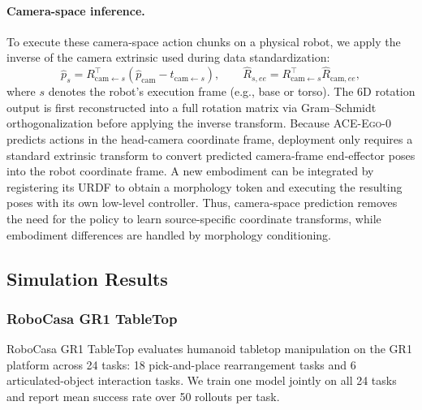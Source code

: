 \documentclass{llmxive}
\providecommand{\OURS}{\textsc{ACE-Ego-0}\xspace}
\providecommand{\Ours}{\OURS}
\begin{document}
\paragraph{Camera-space inference.}
To execute these camera-space action chunks on a physical robot, we apply the inverse of the camera extrinsic used during data standardization:
\begin{equation}
\hat{p}_s = R_{\mathrm{cam}\leftarrow s}^{\top}\!\left(\hat{p}_{\mathrm{cam}} - t_{\mathrm{cam}\leftarrow s}\right),
\qquad
\hat{R}_{s,ee} = R_{\mathrm{cam}\leftarrow s}^{\top}\hat{R}_{\mathrm{cam},ee},
\end{equation}
where $s$ denotes the robot's execution frame (e.g., base or torso). The 6D rotation output is first reconstructed into a full rotation matrix via Gram--Schmidt orthogonalization before applying the inverse transform.
Because \Ours predicts actions in the head-camera coordinate frame, deployment only requires a standard extrinsic transform to convert predicted camera-frame end-effector poses into the robot coordinate frame. A new embodiment can be integrated by registering its URDF to obtain a morphology token and executing the resulting poses with its own low-level controller. Thus, camera-space prediction removes the need for the policy to learn source-specific coordinate transforms, while embodiment differences are handled by morphology conditioning.

\subsection{Simulation Results}
\label{sec:sim_results}

\subsubsection{RoboCasa GR1 TableTop}
\label{sec:robocasa}

RoboCasa GR1 TableTop evaluates humanoid tabletop manipulation on the GR1 platform across 24 tasks: 18 pick-and-place rearrangement tasks and 6 articulated-object interaction tasks. 
We train one model jointly on all 24 tasks and report mean success rate over 50 rollouts per task.
\end{document}
